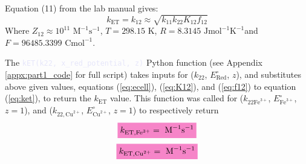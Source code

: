 Equation (11) from the lab manual\autocite{lab_manual} gives:
\begin{equation}
    k_{\text{ET}} = k_{12} \approx \sqrt{k_{11}k_{22}K_{12}f_{12}}
    \label{eq:ket}
\end{equation}
Where $Z_{12} \approx 10^{11} \text{ M}^{-1} \text{s}^{-1}$, $T = 298.15\text{ K}$, $R = 8.3145\text{ Jmol}^{-1}\text{K}^{-1}$and $F = 96485.3399 \text{ Cmol}^{-1}$.
\\
\par The \textcolor{Lavender}{\texttt{kET(k22, x_red_potential, z)}} Python function (see Appendix \ref{appx:part1_code} for full script) takes inputs for ($k_{22}$, $E^{\circ}_{\text{Red}}$, $z$), and substitutes above given values, equations (\ref{eq:ecell}), (\ref{eq:K12}), and (\ref{eq:f12}) to equation (\ref{eq:ket}), to return the $k_{\text{ET}}$ value.
% 
This function was called for ($k_{22 \text{Fe}^{3+}}$, $E^{\circ}_{\text{Fe}^{3+}}$, $z = 1$), and ($k_{22, \text{Cu}^{2+}}$, $E^{\circ}_{\text{Cu}^{2+}}$, $z = 1$) to respectively return
\begin{equation*}
    \mathcolorbox{Lavender}{k_{\text{ET},\text{Fe}^{3+}} =  \text{ M}^{-1} \text{s}^{-1}}
\end{equation*}
\begin{equation*}
    \mathcolorbox{Lavender}{k_{\text{ET},\text{Cu}^{2+}} =  \text{ M}^{-1} \text{s}^{-1}}
\end{equation*}
